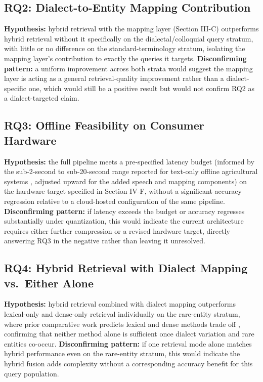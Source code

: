 \documentclass[conference]{IEEEtran}
\begin{document}
\subsection{RQ2: Dialect-to-Entity Mapping Contribution}
\textbf{Hypothesis:} hybrid retrieval with the mapping layer (Section III-C) outperforms hybrid retrieval without it specifically on the dialectal/colloquial query stratum, with little or no difference on the standard-terminology stratum, isolating the mapping layer's contribution to exactly the queries it targets. \textbf{Disconfirming pattern:} a uniform improvement across both strata would suggest the mapping layer is acting as a general retrieval-quality improvement rather than a dialect-specific one, which would still be a positive result but would not confirm RQ2 as a dialect-targeted claim.

\subsection{RQ3: Offline Feasibility on Consumer Hardware}
\textbf{Hypothesis:} the full pipeline meets a pre-specified latency budget (informed by the sub-2-second to sub-20-second range reported for text-only offline agricultural systems \cite{dubey2025aahar,hossain2026bengalirag}, adjusted upward for the added speech and mapping components) on the hardware target specified in Section IV-F, without a significant accuracy regression relative to a cloud-hosted configuration of the same pipeline. \textbf{Disconfirming pattern:} if latency exceeds the budget or accuracy regresses substantially under quantization, this would indicate the current architecture requires either further compression or a revised hardware target, directly answering RQ3 in the negative rather than leaving it unresolved.

\subsection{RQ4: Hybrid Retrieval with Dialect Mapping vs.\ Either Alone}
\textbf{Hypothesis:} hybrid retrieval combined with dialect mapping outperforms lexical-only and dense-only retrieval individually on the rare-entity stratum, where prior comparative work predicts lexical and dense methods trade off \cite{sultania2024hybridsearch}, confirming that neither method alone is sufficient once dialect variation and rare entities co-occur. \textbf{Disconfirming pattern:} if one retrieval mode alone matches hybrid performance even on the rare-entity stratum, this would indicate the hybrid fusion adds complexity without a corresponding accuracy benefit for this query population.
\end{document}
